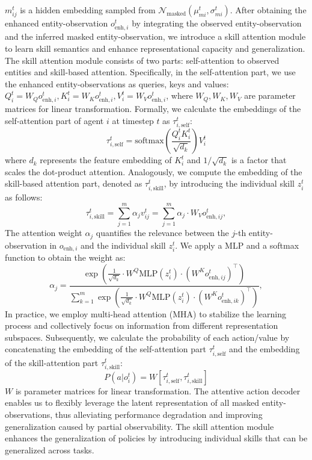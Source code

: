 $m_{ij}^t$ is a hidden embedding sampled from $\mathcal{N}_{\mathrm{masked}}(\mu_{mi}^t, \sigma_{mi}^t)$. After obtaining the enhanced entity-observation $o_{\mathrm{enh},i}^t$ by integrating the observed entity-observation and the inferred masked entity-observation, we introduce a skill attention module to learn skill semantics and enhance representational capacity and generalization. The skill attention module consists of two parts: self-attention to observed entities and skill-based attention. Specifically, in the self-attention part, we use the enhanced entity-observations as queries, keys and values:$Q_i^t=W_Qo_{\mathrm{enh},i}^t,K_i^t=W_Ko_{\mathrm{enh},i}^t,V_i^t=W_Vo_{\mathrm{enh},i}^t$, where $W_Q, W_K, W_V$ are parameter matrices for linear transformation. Formally, we calculate the embeddings of the self-attention part of agent $i$ at timestep $t$ as $\tau_{i,\mathrm{self}}^t$:
\begin{equation}
\tau_{i,\mathrm{self}}^t=\mathrm{softmax}(\frac{Q_i^tK_i^t}{\sqrt{d_k}})V_i^t
\label{eq:(8)}
\end{equation}
where $d_k$ represents the feature embedding of $K_i^t$ and $1/\sqrt{d_k}$ is a factor that scales the dot-product attention. Analogously, we compute the embedding of the skill-based attention part, denoted as $\tau_{i,\mathrm{skill}}^t$, by introducing the  individual skill $z_i^t$ as follows:
\begin{equation}
\tau_{i,\mathrm{skill}}^t=\sum_{j=1}^m\alpha_jv_{ij}^t=\sum_{j=1}^m\alpha_j\cdot W_Vo_{\mathrm{enh},ij}^t,
\label{eq:(9)}
\end{equation}
The attention weight $\alpha_j$ quantifies the relevance between the $j$-th entity-observation in $o_{\mathrm{enh},i}$ and the individual skill $z_i^t$. We apply a MLP and a softmax function to obtain the weight as:
\begin{equation}
    \alpha_j=\frac{\exp\left(\frac1{\sqrt{d_k}}\cdot W^Q\mathrm{MLP}(z_i^t) \cdot\left(W^Ko_{\mathrm{enh},ij}^t\right)^\top\right)}{\sum_{k=1}^m\exp\left(\frac1{\sqrt{d_k}}\cdot W^Q\mathrm{MLP}(z_i^t) \cdot\left(W^Ko_{\mathrm{enh},ik}^t\right)^\top\right)},
    \label{eq:(10)}
\end{equation}
In practice, we employ multi-head attention (MHA) to stabilize the learning process and collectively focus on information from different representation subspaces. Subsequently, we calculate the probability of each action/value by concatenating the embedding of the self-attention part $\tau_{i,\mathrm{self}}^t$ and the embedding of the skill-attention part $\tau_{i,\mathrm{skill}}^t$:
\begin{equation}
    P(a|o_i^t)= W[\tau_{i,\mathrm{self}}^t,\tau_{i,\mathrm{skill}}^t]
    \label{eq:(11)}
\end{equation}
$W$ is parameter matrices for linear transformation. The attentive action decoder enables us to flexibly leverage the latent representation of all masked entity-observations, thus alleviating performance degradation and improving generalization caused by partial observability. The skill attention module enhances the generalization of policies by introducing individual skills that can be generalized across tasks.


